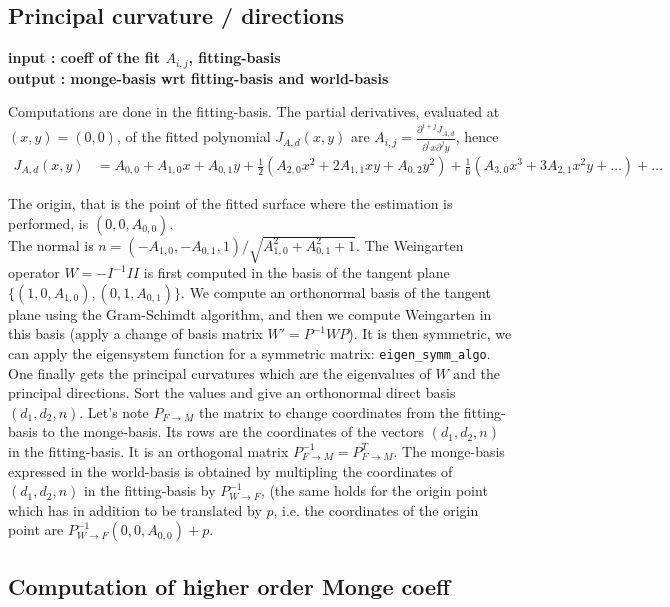 \subsection{Principal  curvature / directions}

{\bf input : coeff of the fit $A_{i,j}$, 
fitting-basis \\
output : monge-basis wrt fitting-basis and world-basis
}

Computations are done in the fitting-basis.  The partial derivatives,
evaluated at $(x,y)=(0,0)$, of the fitted polynomial $J_{A,d}(x,y)$ are
$A_{i,j}=\frac{\partial^{i+j}J_{A,d}}{\partial^ix
\partial^jy}$, hence
\begin{eqnarray}
J_{A,d}(x,y)&=
A_{0,0}+A_{1,0}x+A_{0,1}y+\frac{1}{2}(A_{2,0}x^2+2A_{1,1}xy+A_{0,2}y^2) 
+ \frac{1}{6}(A_{3,0}x^3+3A_{2,1}x^2y+\ldots )+ \ldots 
\end{eqnarray}


The origin, that is the point of the fitted surface where the
estimation is performed, is $(0,0,A_{0,0})$. \\ The normal is
$n=(-A_{1,0},-A_{0,1},1)/\sqrt{A_{1,0}^2+A_{0,1}^2+1}$. The Weingarten
operator $W=-I^{-1}II$ is first computed in the basis of the tangent
plane $\{ (1,0,A_{1,0}), (0,1,A_{0,1}) \}$. We compute an orthonormal basis of the
tangent plane using the Gram-Schimdt algorithm, and then we compute
Weingarten in this basis (apply a change of basis matrix
$W'=P^{-1}WP$). It is then symmetric, we can apply the eigensystem
function for a symmetric matrix:
\verb+eigen_symm_algo+.
One finally gets the principal curvatures which are the eigenvalues of
$W$ and the principal directions. Sort the values and give an
orthonormal direct basis $(d_1,d_2,n)$. Let's note $P_{F
\rightarrow M}$ the matrix to change coordinates from the
fitting-basis to the monge-basis. Its rows are the coordinates of the
vectors $(d_1,d_2,n)$ in the fitting-basis. It is an orthogonal matrix
$P_{F \rightarrow M}^{-1}=P_{F \rightarrow M}^T$. The monge-basis
expressed in the world-basis is obtained by multipling the coordinates
of $(d_1,d_2,n)$ in the fitting-basis by $P_{W\rightarrow F}^{-1}$,
(the same holds for the origin point which has in addition to be
translated by $p$, i.e. the coordinates of the origin point are
$P_{W\rightarrow F}^{-1} (0,0,A_{0,0}) +p$.

\subsection{Computation of higher order Monge coeff}

